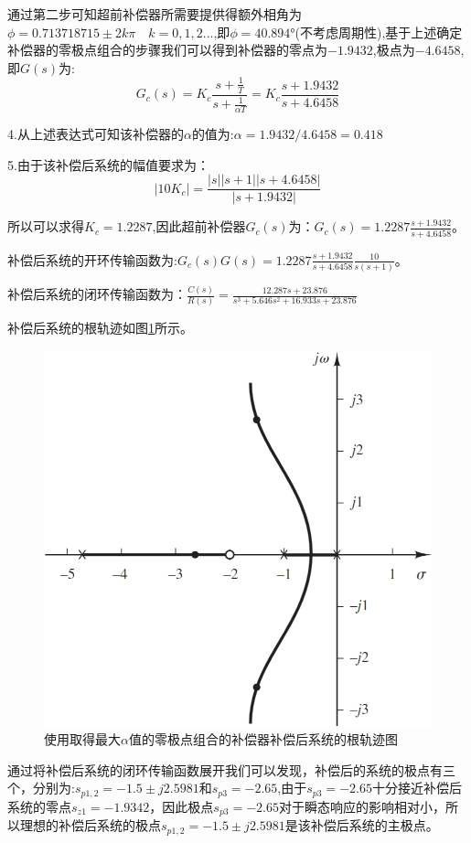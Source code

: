 \documentclass{article}
\numberwithin{equation}{section}
\numberwithin{figure}{section}
\begin{document}
通过第二步可知超前补偿器所需要提供得额外相角为$\phi=0.713718715 \pm 2k\pi \quad k=0,1,2...$,即$\phi = 40.894°$(不考虑周期性),基于上述确定补偿器的零极点组合的步骤我们可以得到补偿器的零点为$-1.9432$,极点为$-4.6458$,即$G(s)$为:
\begin{equation}
    G_c(s)=K_c\frac{s+\frac{1}{T}}{s+\frac{1}{\alpha T}}=K_c\frac{s+1.9432}{s+4.6458}
\end{equation}

4.从上述表达式可知该补偿器的$\alpha$的值为:$\alpha = 1.9432/4.6458 =0.418$

5.由于该补偿后系统的幅值要求为：
\begin{equation}
    |10K_c|=\frac{|s||s+1||s+4.6458|}{|s+1.9432|}
\end{equation}

所以可以求得$K_c=1.2287$,因此超前补偿器$G_c(s)$为：$G_c(s)=1.2287\frac{s+1.9432}{s+4.6458}$。

补偿后系统的开环传输函数为:$G_c(s)G(s)=1.2287\frac{s+1.9432}{s+4.6458}\frac{10}{s(s+1)}$。

补偿后系统的闭环传输函数为：$\frac{C(s)}{R(s)}=\frac{12.287s+23.876}{s^3+5.646s^2+16.933s+23.876}$

补偿后系统的根轨迹如图\ref{largerαrootlocus}所示。

\begin{figure}
    \centering
    \includegraphics[width=.4\textwidth]{Chapter6/largerαrootlocus.png} %
    \caption{使用取得最大$\alpha$值的零极点组合的补偿器补偿后系统的根轨迹图} %
    \label{largerαrootlocus} %
\end{figure}

通过将补偿后系统的闭环传输函数展开我们可以发现，补偿后的系统的极点有三个，分别为:$s_{p1,2}=-1.5 \pm j2.5981$和$s_{p3}=-2.65$,由于$s_{p3}=-2.65$十分接近补偿后系统的零点$s_{z1}=-1.9342$，因此极点$s_{p3}=-2.65$对于瞬态响应的影响相对小，所以理想的补偿后系统的极点$s_{p1,2}=-1.5 \pm j2.5981$是该补偿后系统的主极点。
\end{document}

